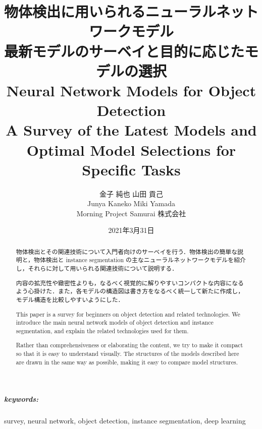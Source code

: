 \documentclass[twocolumn]{jsarticle} %
\begin{document}
\title{物体検出に用いられるニューラルネットワークモデル \\
    \Large 最新モデルのサーベイと目的に応じたモデルの選択 \\
    Neural Network Models for Object Detection \\
    \large A Survey of the Latest Models and Optimal Model Selections for Specific Tasks}
\author{金子 純也 \hspace{15mm} 山田 貢己 \\ Junya Kaneko \qquad Miki Yamada \\ Morning Project Samurai 株式会社}
\date{2021年3月31日}
\maketitle

\subparagraph{keywords:} survey, neural network, object detection, instance segmentation, deep learning

\begin{abstract}
物体検出とその関連技術について入門者向けのサーベイを行う．物体検出の簡単な説明と，物体検出と instance segmentation の主なニューラルネットワークモデルを紹介し，それらに対して用いられる関連技術について説明する．

内容の拡充性や緻密性よりも，なるべく視覚的に解りやすいコンパクトな内容になるよう心掛けた．また，各モデルの構造図は書き方をなるべく統一して新たに作成し，モデル構造を比較しやすいようにした．

This paper is a survey for beginners on object detection and related technologies. 
We introduce the main neural network models of object detection and instance segmentation, and explain the related technologies used for them.

Rather than comprehensiveness or elaborating the content, we try to make it compact so that it is easy to understand visually.
The structures of the models described here are drawn in the same way as possible, making it easy to compare model structures. 
\end{abstract}
\end{document}
